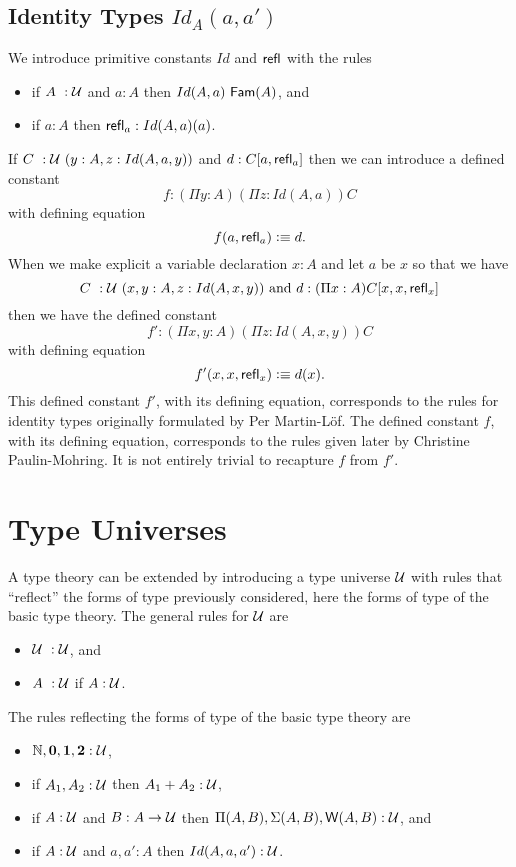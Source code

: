 \subsection*{Identity Types $Id_A(a,a')$}
We introduce primitive constants $Id$ and $\mathsf{refl}_{}$ with the rules
\begin{itemize}
\item if $A~ : \mathcal{U}$ and $a:A$ then $Id(A,a)~{\sf Fam}(A)$, and
\item if $a:A$ then $\mathsf{refl}_{a}:Id(A,a)(a)$.
\end{itemize}
If $C~ : \mathcal{U}~(y:A,z:Id(A,a,y))$ and $d:C[a,\mathsf{refl}_{a}]$ then we can introduce a defined constant 
\[
  f:(\Pi y:A)(\Pi z:Id(A,a))C
\]
with defining equation
  \[ f(a,\mathsf{refl}_{a})\vcentcolon\equiv d.\]
When we make explicit a variable declaration $x:A$ 
and let $a$ be $x$ 
so that we have 
\[
  C~ : \mathcal{U}~(x,y:A, z:Id(A,x,y))\mbox{ and  }d:(\Pi x:A)C[x,x,\mathsf{refl}_{x}]
\]
then we have the defined constant
\[
  f':(\Pi x,y:A)(\Pi z:Id(A,x,y))C
\]
with defining equation
\[
  f'(x,x,\mathsf{refl}_{x})\vcentcolon\equiv d(x).
\]
This defined constant $f'$, with its defining equation, corresponds to the rules for identity types originally formulated by Per Martin-L\"{o}f.   The defined constant $f$, with its defining equation, corresponds to the rules given later by Christine Paulin-Mohring.  It is not entirely trivial to recapture $f$ from $f'$.


\section*{Type Universes}

 A type theory can be extended by introducing a type universe $\mathcal{U}$ with rules that ``reflect'' the forms of type previously considered, here the forms of type of the basic type theory.  The general rules for $\mathcal{U}$ are

\begin{itemize}
\item $\mathcal{U}~ : \mathcal{U}$, and
\item $A~ : \mathcal{U}$ if $A:\mathcal{U}$.
\end{itemize}

The rules reflecting the forms of type of the basic type theory are

\begin{itemize}
\item $\mathbb{N},\mathbf{0},\mathbf{1},\mathbf{2}:\mathcal{U}$,
\item if $A_1,A_2:\mathcal{U}$ then $A_1+A_2:\mathcal{U}$,
\item if $A:\mathcal{U}$ and $B:A\rightarrow\mathcal{U}$ then     $\Pi(A,B),\Sigma(A,B),{\sf W}(A,B):\mathcal{U}$, and 
\item if $A:\mathcal{U}$ and $a,a':A$ then $Id(A,a,a'):\mathcal{U}$.
\end{itemize}

